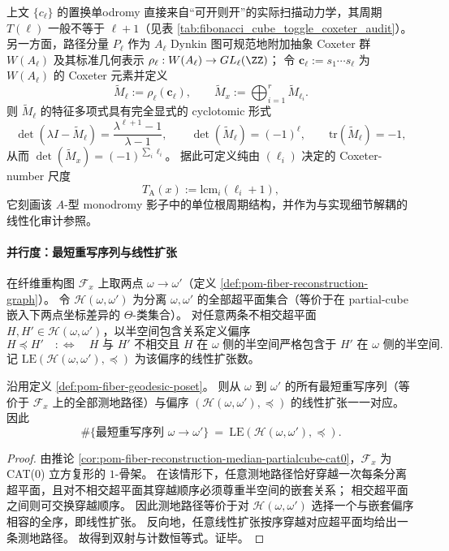 \begin{remark}\label{rem:pom-Ashadow-coxeter-monodromy}
上文 \(\{c_\ell\}\) 的置换单odromy 直接来自“可开则开”的实际扫描动力学，其周期 \(T(\ell)\) 一般不等于 \(\ell+1\)（见表 \ref{tab:fibonacci_cube_toggle_coxeter_audit}）。
另一方面，路径分量 \(P_\ell\) 作为 \(A_\ell\) Dynkin 图可规范地附加抽象 Coxeter 群 \(W(A_\ell)\) 及其标准几何表示
\(\rho_\ell:W(A_\ell)\to GL_\ell(\ZZ)\)；
令 \(\mathbf c_\ell:=s_1\cdots s_\ell\) 为 \(W(A_\ell)\) 的 Coxeter 元素并定义
\[
\widetilde M_\ell:=\rho_\ell(\mathbf c_\ell),
\qquad
\widetilde M_x:=\bigoplus_{i=1}^r \widetilde M_{\ell_i}.
\]
则 \(\widetilde M_\ell\) 的特征多项式具有完全显式的 cyclotomic 形式
\[
\det(\lambda I-\widetilde M_\ell)=\frac{\lambda^{\ell+1}-1}{\lambda-1},
\qquad
\det(\widetilde M_\ell)=(-1)^\ell,\qquad \mathrm{tr}(\widetilde M_\ell)=-1,
\]
从而 \(\det(\widetilde M_x)=(-1)^{\sum_i \ell_i}\)。
据此可定义纯由 \((\ell_i)\) 决定的 Coxeter-number 尺度
\[
T_{\mathrm A}(x):=\mathrm{lcm}_i(\ell_i+1),
\]
它刻画该 \(A\)-型 monodromy 影子中的单位根周期结构，并作为与实现细节解耦的线性化审计参照。
\end{remark}

\paragraph{并行度：最短重写序列与线性扩张}

\begin{definition}[区间超平面偏序与线性扩张数]\label{def:pom-fiber-geodesic-poset}
在纤维重构图 \(\mathcal F_x\) 上取两点 \(\omega\to \omega'\)（定义 \ref{def:pom-fiber-reconstruction-graph}）。
令 \(\mathcal H(\omega,\omega')\) 为分离 \(\omega,\omega'\) 的全部超平面集合（等价于在 partial-cube 嵌入下两点坐标差异的 \(\Theta\)-类集合）。
对任意两条不相交超平面 \(H,H'\in\mathcal H(\omega,\omega')\)，以半空间包含关系定义偏序
\[
H\preceq H'\quad:\Longleftrightarrow\quad
\text{\(H\) 与 \(H'\) 不相交且 \(H\) 在 \(\omega\) 侧的半空间严格包含于 \(H'\) 在 \(\omega\) 侧的半空间}.
\]
记 \(\mathrm{LE}(\mathcal H(\omega,\omega'),\preceq)\) 为该偏序的线性扩张数。
\end{definition}

\begin{theorem}\label{thm:pom-fiber-geodesic-linear-extension}
沿用定义 \ref{def:pom-fiber-geodesic-poset}。
则从 \(\omega\) 到 \(\omega'\) 的所有最短重写序列（等价于 \(\mathcal F_x\) 上的全部测地路径）与偏序 \((\mathcal H(\omega,\omega'),\preceq)\) 的线性扩张一一对应。
因此
\[
\#\{\text{最短重写序列 } \omega\to \omega'\}
\ =\
\mathrm{LE}(\mathcal H(\omega,\omega'),\preceq).
\]
\end{theorem}
\begin{proof}
由推论 \ref{cor:pom-fiber-reconstruction-median-partialcube-cat0}，\(\mathcal F_x\) 为 CAT(0) 立方复形的 \(1\)-骨架。
在该情形下，任意测地路径恰好穿越一次每条分离超平面，且对不相交超平面其穿越顺序必须尊重半空间的嵌套关系；
相交超平面之间则可交换穿越顺序。
因此测地路径等价于对 \(\mathcal H(\omega,\omega')\) 选择一个与嵌套偏序相容的全序，即线性扩张。
反向地，任意线性扩张按序穿越对应超平面均给出一条测地路径。
故得到双射与计数恒等式。证毕。
\end{proof}

